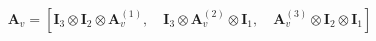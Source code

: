 \begin{equation}
\mathbf{A}_v =
\left[
    \mathbf{I}_3 \otimes \mathbf{I}_2 \otimes \mathbf{A}_v^{(1)}, \quad
    \mathbf{I}_3 \otimes \mathbf{A}_v^{(2)} \otimes\mathbf{I}_1, \quad
    \mathbf{A}_v^{(3)} \otimes \mathbf{I}_2 \otimes\mathbf{I}_1
\right]
\end{equation}
